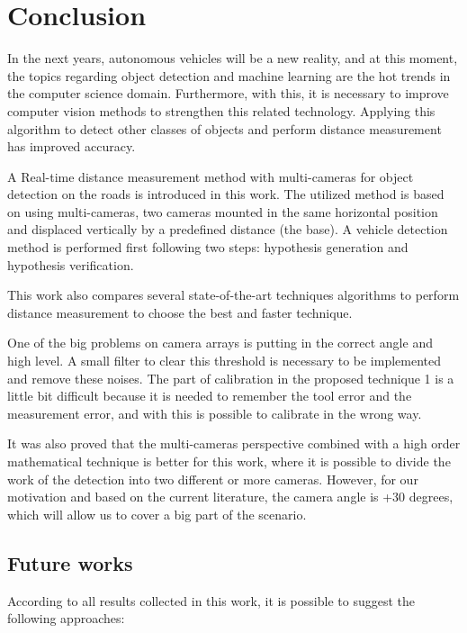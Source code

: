 \chapter{Conclusion}
\label{capitulo6}


In the next years, autonomous vehicles will be a new reality, and at this moment, the topics regarding object detection and machine learning are the hot trends in the computer science domain. Furthermore, with this, it is necessary to improve computer vision methods to strengthen this related technology. Applying this algorithm to detect other classes of objects and perform distance measurement has improved accuracy. 

A Real-time distance measurement method with multi-cameras for object detection on the roads is introduced in this work. The utilized method is based on using multi-cameras, two cameras mounted in the same horizontal position and displaced vertically by a predefined distance (the base). A vehicle detection method is performed first following two steps: hypothesis generation and hypothesis verification. 


This work also compares several state-of-the-art techniques algorithms to perform distance measurement to choose the best and faster technique. 

One of the big problems on camera arrays is putting in the correct angle and high level. A small filter to clear this threshold is necessary to be implemented and remove these noises. The part of calibration in the proposed technique 1 is a little bit difficult because it is needed to remember the tool error and the measurement error, and with this is possible to calibrate in the wrong way. 

It was also proved that the multi-cameras perspective combined with a high order mathematical technique is better for this work, where it is possible to divide the work of the detection into two different or more cameras. However, for our motivation and based on the current literature, the camera angle is +30 degrees, which will allow us to cover a big part of the scenario.   

\section{Future works}

According to all results collected in this work, it is possible to suggest the following approaches:

